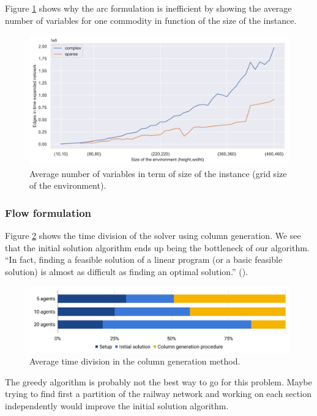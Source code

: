 \documentclass[14pt,a4paper]{article}
\theoremstyle{definition}
\numberwithin{equation}{subsection}
\begin{document}
Figure \ref{fig:numberVar} shows why the arc formulation is inefficient by showing the average number of variables for one commodity in function of the size of the instance.


\begin{figure}[h]
	\centering
	\includegraphics[width=\linewidth]{img/number_variables.jpg}
	\caption{Average number of variables in term of size of the instance (grid size of the environment).}
	\label{fig:numberVar}
\end{figure}

\subsubsection{Flow formulation}

Figure \ref{fig:time repartition} shows the time division of the solver using column generation. We see that the initial solution algorithm ends up being the bottleneck of our algorithm. \enquote{In fact, finding a feasible solution of a linear program (or a basic feasible solution) is almost as difficult as finding an optimal solution.} (\cite{networkflows}).


\begin{figure}[h]
	\centering
	\includegraphics[width=\linewidth]{img/time_repartition.png}
	\caption{Average time division in the column generation method.}
	\label{fig:time repartition}
\end{figure}

The greedy algorithm is probably not the best way to go for this problem. Maybe trying to find first a partition of the railway network and working on each section independently would improve the initial solution algorithm.
\end{document}
